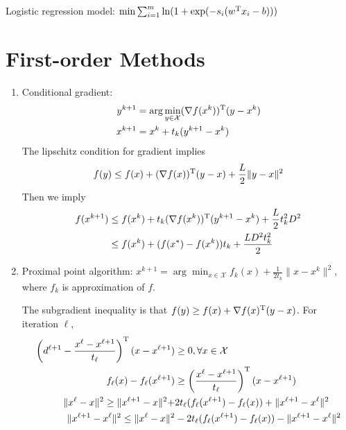 Logistic regression model: $\min\sum_{i=1}^m\ln(1+\exp(-s_i(w^{\mathrm T} x_i - b)))$

\section{First-order Methods}
\begin{enumerate}
\item
Conditional gradient: 
\begin{align*}
y^{k+1}&=\arg\min_{y\in\mathcal{X}}(\nabla f(x^k))^{\mathrm T} (y-x^k)\\
x^{k+1}&=x^k+t_k(y^{k+1} - x^k)
\end{align*}
The lipschitz condition for gradient implies
\[
f(y)\le f(x)+(\nabla f(x))^{\mathrm T}(y-x)+\frac{L}{2}\|y-x\|^2
\]
Then we imply
\begin{align*}
f(x^{k+1})&\le f(x^k) + t_k(\nabla f(x^k))^{\mathrm T}(y^{k+1} - x^k)+\frac{L}{2}t_k^2D^2\\
&\le f(x^k)+(f(x^*)-f(x^k))t_k + \frac{LD^2t_k^2}{2}
\end{align*}
\item
Proximal point algorithm: $x^{k+1} = \arg\min_{x\in\mathcal{X}}f_k(x)+\frac{1}{2t_k}\|x-x^k\|^2$, where $f_k$ is approximation of $f$.

The subgradient inequality is that $f(y)\ge f(x)+\nabla f(x)^{\mathrm T}(y-x)$. For iteration $\ell$,
\begin{align*}
\left(d^{\ell+1}-\frac{x^\ell-x^{\ell+1}}{t_{\ell}}\right)^{\mathrm T}(x-x^{\ell+1})&\ge0,\forall x\in\mathcal{X}\\
f_\ell(x) - f_\ell(x^{\ell+1})&\ge\left(\frac{x^\ell-x^{\ell+1}}{t_{\ell}}\right)^{\mathrm T}(x-x^{\ell+1})\\
\|x^{\ell}-x\|^2\ge\|x^{\ell+1}-x\|^2+&2t_{\ell}(f_{\ell}(x^{\ell+1}) - f_\ell(x))+\|x^{\ell+1}-x^\ell\|^2\\
\|x^{\ell+1}-x^\ell\|^2\le\|x^{\ell}-x\|^2 &- 2t_{\ell}(f_{\ell}(x^{\ell+1}) - f_\ell(x))-\|x^{\ell+1}-x^\ell\|^2
\end{align*}


\end{enumerate}
